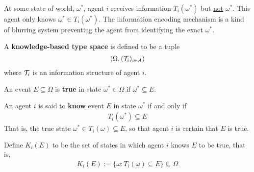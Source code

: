 \documentclass{article}
\begin{document}
    \begin{remark}[Interpretation]
    	At some state of world, $\omega^*$, agent $i$ receives information $T_i(\omega^*)$ but \ul{not} $\omega^*$. This agent only knows $\omega^* \in T_i(\omega^*)$. The information encoding mechanism is a kind of blurring system preventing the agent from identifying the exact $\omega^*$.
    \end{remark}
    
    \begin{definition}
    	A \textbf{knowledge-based type space} is defined to be a tuple
    	\begin{align}
    		(\Omega, (\mathcal{{T}}_i)_{i \in A})
    	\end{align}
    	where $\mathcal{{T}}_i$ is an information structure of agent $i$.
    \end{definition}
    
    \begin{definition}
    	An event $E \subseteq \Omega$ is \textbf{true} in state $\omega^* \in \Omega$ if $\omega^* \subseteq E$. 
    \end{definition}
   
   	\begin{definition}
   		An agent $i$ is said to \textbf{know} event $E$ in state $\omega^*$ if and only if
   		\begin{align}
   			T_i(\omega^*) \subseteq E
   		\end{align}
   		That is, the true state $\omega^* \in T_i(\omega) \subseteq E$, so that agent $i$ is certain that $E$ is true.
   	\end{definition}
   	
   	\begin{definition}
   		Define $K_i(E)$ to be the set of states in which agent $i$ knows $E$ to be true, that is,
   		\begin{align}
   			K_i(E) := \{\omega: T_i(\omega) \subseteq E\} \subseteq \Omega
   		\end{align}
   	\end{definition}
   	
\end{document}
